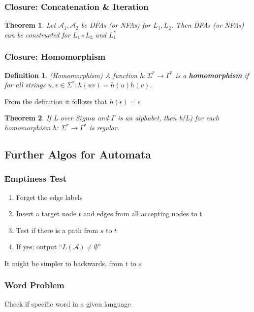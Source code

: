 \documentclass[a3paper, 8pt]{extarticle}
\newtheorem{theorem}{Theorem}[section]
\newtheorem*{definition}{Definition}
\begin{document}
\begin{multicols*}{6}
\subsubsection{Closure: Concatenation \& Iteration}


\begin{theorem}
    Let $\mathcal{A}_1,\mathcal{A}_2$ be DFAs (or NFAs) for $L_1, L_2$. Then DFAs (or NFAs) can be constructed for $L_1 \circ L_2$ and $L_1^*$
\end{theorem}
\subsubsection{Closure: Homomorphism}

\begin{definition}(Homomorphism)
A function $h: \Sigma^* \to \Gamma^*$ is a \textbf{homomorphism} if for all strings $u,v \in \Sigma^*: h(uv)=h(u)h(v)$.\end{definition} From the definition it follows that $h(\epsilon)=\epsilon$

\begin{theorem}
    If L over $Sigma$ and $\Gamma$ is an alphabet, then h(L) for each homomorphism h: $\Sigma^* \to \Gamma^*$
    is regular.
\end{theorem}
\subsection{Further Algos for Automata}
\subsubsection{Emptiness Test}
\begin{enumerate}
    \item Forget the edge labels
    \item Insert a target node $t$ and edges from all accepting nodes to t \item Test if there is a path from $s$ to $t$
    \item If yes: output “$L(\mathcal{A}) \neq \emptyset$”
\end{enumerate}

It might be simpler to backwards, from $t$ to $s$

\subsubsection{Word Problem}
Check if specific word in a given language


\end{multicols*}
\end{document}
